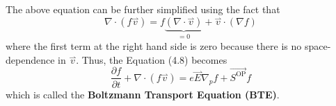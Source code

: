 \begin{equation}
\end{equation} The above equation can be further simplified using the fact that \begin{equation}
    \nabla\cdot(f\overset{\rightharpoonup}{v}) = f\underbrace{(\nabla\cdot\overset{\rightharpoonup}{v})}_{=0} + \overset{\rightharpoonup}{v}\cdot(\nabla f)
\end{equation} where the first term at the right hand side is zero because there is no space-dependence in $\overset{\rightharpoonup}{v}$. Thus, the Equation (4.8) becomes \begin{equation}
    \boxed{\frac{\partial f}{\partial t} + \nabla\cdot(f\overset{\rightharpoonup}{v}) = e\overset{\rightharpoonup}{E}\nabla_{p}f + \vec{S^{\text{OP}}}f}
\end{equation} which is called the {\bf Boltzmann Transport Equation (BTE)}.
